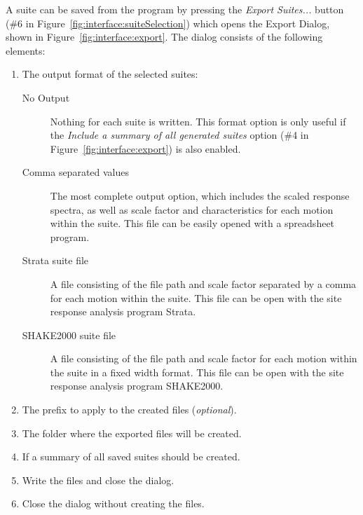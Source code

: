 \documentclass[11pt]{article}
\begin{document}
A suite can be saved from the program by pressing the \emph{Export Suites...}
button (\#6 in Figure~\ref{fig:interface:suiteSelection}) which opens the
Export Dialog, shown in Figure~\ref{fig:interface:export}. The dialog
consists of the following elements:
\begin{enumerate}
  \item The output format of the selected suites:
	\begin{description}
	  \item[No Output] Nothing for each suite is written. This format option is
		only useful if the \emph{Include a summary of all generated suites}
		option (\#4 in Figure~\ref{fig:interface:export}) is also enabled.
	  \item[Comma separated values] The most complete output option, which
		includes the scaled response spectra, as well as scale factor and
		characteristics for each motion within the suite. This file can be
		easily opened with a spreadsheet program.
	  \item[Strata suite file] A file consisting of the file path and scale
		factor separated by a comma for each motion within the suite. This file
		can be open with the site response analysis program Strata.
	  \item[SHAKE2000 suite file] A file consisting of the file path and scale
		factor for each motion within the suite in a fixed width format. This file
		can be open with the site response analysis program SHAKE2000.
	\end{description}
  \item The prefix to apply to the created files (\emph{optional}).
  \item The folder where the exported files will be created.
  \item If a summary of all saved suites should be created.
  \item Write the files and close the dialog.
  \item Close the dialog without creating the files.
\end{enumerate}
\end{document}
